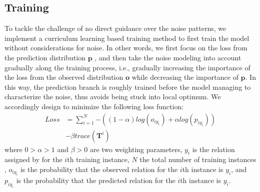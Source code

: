 \subsection{Training}
To tackle the challenge of no direct guidance over the noise patterns,
we implement a curriculum learning based training method to
first train the model without considerations for noise. In other words, we first focus on the loss from the prediction distribution $\mathbf{p}$ ,  and then take the noise modeling into account gradually along the training process, i.e., gradually increasing the importance of the loss from the observed distribution $\mathbf{o}$ while decreasing the importance of $\mathbf{p}$. In this way, the prediction branch is roughly trained before the model managing to characterize the noise, thus avoids being stuck into local optimum.
We accordingly design to minimize  the following loss function:
%
%
\begin{equation}
\begin{aligned}
Loss	&=\sum_{i=1}^N{-((1-\alpha) log(o_{iy_{i}}) + \alpha log(p_{iy_{i}}))} \\
&- \beta trace(\mathbf{T}^{i})
\end{aligned}
\label{general_loss}
\end{equation}
where $0>\alpha>1$ and $\beta>0$ are two weighting parameters, $y_i$ is the relation assigned by \DS for the $i$th training instance, $N$ the total number of training instances , $o_{iy_{i}}$ is the probability that the observed relation for the $i$th instance is $y_i$, and $p_{iy_{i}}$ is the probability that the predicted relation for the $i$th instance is $y_i$.

